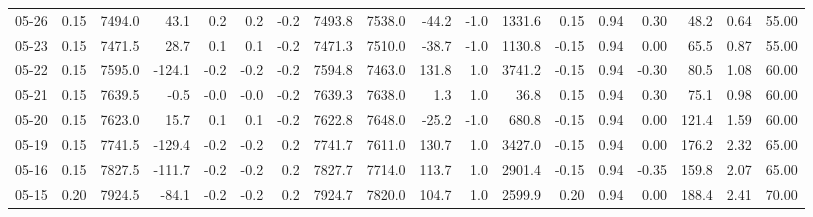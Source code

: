 \begin{threeparttable}
{\begin{tabular}{lrrrrrrrrrrrrrrrrr}
  05-26 &     0.15 & 7494.0 &              43.1 &               0.2 &                0.2 &               -0.2 & 7493.8 & 7538.0 &      -44.2 &                     -1.0 &              1331.6 &       0.15 &      0.94 &           0.30 &             48.2 &            0.64 &                  55.00 \\
  05-23 &     0.15 & 7471.5 &              28.7 &               0.1 &                0.1 &               -0.2 & 7471.3 & 7510.0 &      -38.7 &                     -1.0 &              1130.8 &      -0.15 &      0.94 &           0.00 &             65.5 &            0.87 &                  55.00 \\
  05-22 &     0.15 & 7595.0 &            -124.1 &              -0.2 &               -0.2 &               -0.2 & 7594.8 & 7463.0 &      131.8 &                      1.0 &              3741.2 &      -0.15 &      0.94 &          -0.30 &             80.5 &            1.08 &                  60.00 \\
  05-21 &     0.15 & 7639.5 &              -0.5 &              -0.0 &               -0.0 &               -0.2 & 7639.3 & 7638.0 &        1.3 &                      1.0 &                36.8 &       0.15 &      0.94 &           0.30 &             75.1 &            0.98 &                  60.00 \\
  05-20 &     0.15 & 7623.0 &              15.7 &               0.1 &                0.1 &               -0.2 & 7622.8 & 7648.0 &      -25.2 &                     -1.0 &               680.8 &      -0.15 &      0.94 &           0.00 &            121.4 &            1.59 &                  60.00 \\
  05-19 &     0.15 & 7741.5 &            -129.4 &              -0.2 &               -0.2 &                0.2 & 7741.7 & 7611.0 &      130.7 &                      1.0 &              3427.0 &      -0.15 &      0.94 &           0.00 &            176.2 &            2.32 &                  65.00 \\
  05-16 &     0.15 & 7827.5 &            -111.7 &              -0.2 &               -0.2 &                0.2 & 7827.7 & 7714.0 &      113.7 &                      1.0 &              2901.4 &      -0.15 &      0.94 &          -0.35 &            159.8 &            2.07 &                  65.00 \\
  05-15 &     0.20 & 7924.5 &             -84.1 &              -0.2 &               -0.2 &                0.2 & 7924.7 & 7820.0 &      104.7 &                      1.0 &              2599.9 &       0.20 &      0.94 &           0.00 &            188.4 &            2.41 &                  70.00 \\

\end{tabular}}
\end{threeparttable}
